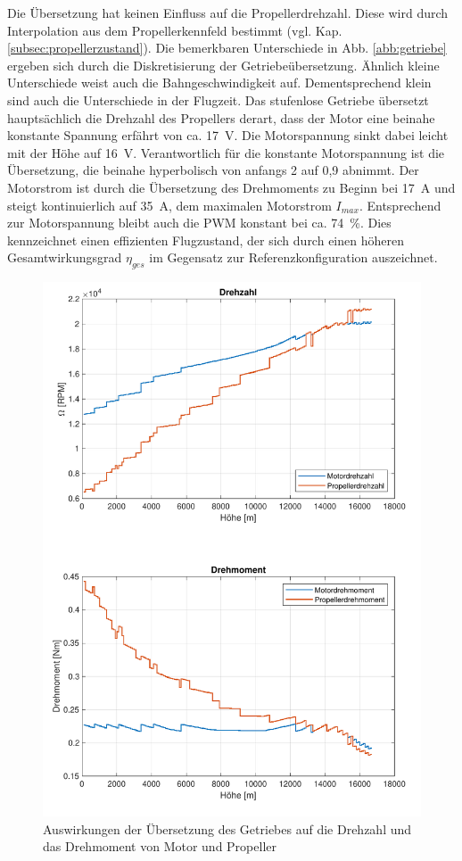 Die Übersetzung hat keinen Einfluss auf die Propellerdrehzahl. Diese wird durch Interpolation aus dem Propellerkennfeld bestimmt (vgl. Kap. \ref{subsec:propellerzustand}). Die bemerkbaren Unterschiede in Abb. \ref{abb:getriebe} ergeben sich durch die Diskretisierung der Getriebeübersetzung.
Ähnlich kleine Unterschiede weist auch die Bahngeschwindigkeit auf. Dementsprechend klein sind auch die Unterschiede in der Flugzeit. Das stufenlose Getriebe übersetzt hauptsächlich die Drehzahl des Propellers derart, dass der Motor eine beinahe konstante Spannung erfährt von ca. \SI{17}{V}. Die Motorspannung sinkt dabei leicht mit der Höhe auf \SI{16}{V}. Verantwortlich für die konstante Motorspannung ist die Übersetzung, die beinahe hyperbolisch von anfangs 2 auf 0,9 abnimmt. Der Motorstrom ist durch die Übersetzung des Drehmoments zu Beginn bei \SI{17}{A} und steigt kontinuierlich auf \SI{35}{A}, dem maximalen Motorstrom \ensuremath{I_{max}}. Entsprechend zur Motorspannung bleibt auch die PWM konstant bei ca. \SI{74}{\%}. Dies kennzeichnet einen effizienten Flugzustand, der sich durch einen höheren Gesamtwirkungsgrad \ensuremath{\eta_{ges}} im Gegensatz zur Referenzkonfiguration auszeichnet.

\begin{figure}[H]
\centering
	\includegraphics[scale=0.5]{Diagramme/Drehzahl_und_Drehmoment.pdf}
	\caption{Auswirkungen der Übersetzung des Getriebes auf die Drehzahl und das Drehmoment von Motor und Propeller}
	\label{abb:getriebe_dud}
\end{figure}

